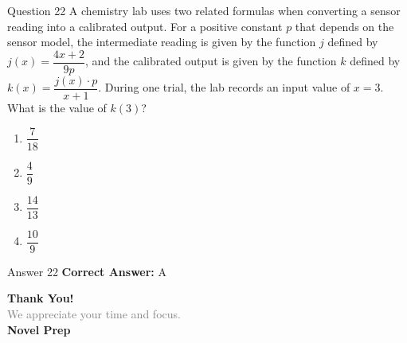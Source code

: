 \documentclass{beamer}
\begin{document}
\begin{frame}{Question 22}
\small
A chemistry lab uses two related formulas when converting a sensor reading into a calibrated output. For a positive constant \(p\) that depends on the sensor model, the intermediate reading is given by the function \(j\) defined by \(j(x) = \dfrac{4x + 2}{9p}\), and the calibrated output is given by the function \(k\) defined by \(k(x) = \dfrac{j(x) \cdot p}{x + 1}\). During one trial, the lab records an input value of \(x = 3\). What is the value of \(k(3)\)?
\vspace{0.35cm}
\begin{enumerate}
    \item[A.] \(\dfrac{7}{18}\)
    \item[B.] \(\dfrac{4}{9}\)
    \item[C.] \(\dfrac{14}{13}\)
    \item[D.] \(\dfrac{10}{9}\)
\end{enumerate}
\end{frame}
\begin{frame}{Answer 22}
\small
\textbf{Correct Answer:} A
\end{frame}

\begin{frame}{}
    \centering
    \vspace{5em}
    {\Huge \textbf{\textcolor{novelPurple}{Thank You!}}} \\[1em]
    {\large \textcolor{gray}{We appreciate your time and focus.}} \\[3em]
    {\LARGE \textbf{\textcolor{novelPurple}{\textsf{Novel Prep}}}}
    \vfill
\end{frame}
\end{document}
